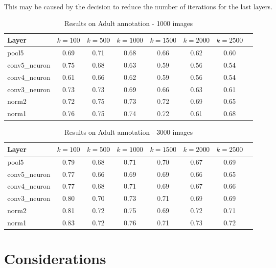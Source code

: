 This may be caused by the decision to reduce the number of iterations for the last layers.

\begin{table*}[htbp]
\caption{Results on Adult annotation - 1000 images}
\centering
\begin{tabular}{lccccccc}
    Layer       & $k=100$ & $k=500$ & $k=1000$ & $k=1500$ &
    $k=2000$ & $k=2500$ \\
    \midrule
    pool5        & 0.69 & 0.71 & 0.68 & 0.66 & 0.62 & 0.60 \\
    conv5\_neuron        & 0.75 & 0.68 & 0.63 & 0.59 & 0.56 & 0.54 \\
    conv4\_neuron      & 0.61 & 0.66 & 0.62 & 0.59 & 0.56 & 0.54 \\
    conv3\_neuron        & 0.73 & 0.73 & 0.69 & 0.66 & 0.63 & 0.61 \\
    norm2        & 0.72 & 0.75 & 0.73 & 0.72 & 0.69 & 0.65 \\
    norm1        & 0.76 & 0.75 & 0.74 & 0.72 & 0.61 & 0.68 \\
\end{tabular}
\label{tbl:meas_sparse}
\end{table*}

\begin{table*}[htbp]
\caption{Results on Adult annotation - 3000 images}
\centering
\begin{tabular}{lccccccc}
    Layer       & $k=100$ & $k=500$ & $k=1000$ & $k=1500$ &
    $k=2000$ & $k=2500$ \\
    \midrule
    pool5        & 0.79 & 0.68 & 0.71 & 0.70 & 0.67 & 0.69 \\
    conv5\_neuron         & 0.77 & 0.66 & 0.69 & 0.69 & 0.66 & 0.65 \\
    conv4\_neuron       & 0.77 & 0.68 & 0.71 & 0.69 & 0.67 & 0.66 \\
    conv3\_neuron        & 0.80 & 0.70 & 0.73 & 0.71 & 0.69 & 0.69 \\
    norm2        & 0.81 & 0.72 & 0.75 & 0.69 & 0.72 & 0.71 \\
    norm1        & 0.83 & 0.72 & 0.76 & 0.71 & 0.73 & 0.72 \\
\end{tabular}
\label{tbl:meas_sparse_3k}
\end{table*}

\section{Considerations}

